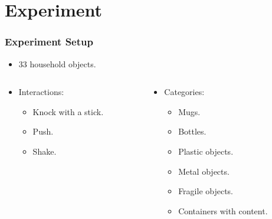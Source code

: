 \documentclass{beamer}
\begin{document}
  \section{Experiment}
  \begin{frame}
    \frametitle{Experiment Setup}

    \begin{itemize}
      \item 33 household objects.
    \end{itemize}

    \begin{columns}
      \begin{column}{.45\textwidth}
        \begin{itemize}
          \item Interactions:
            \begin{itemize}
              \item Knock with a stick.
              \item Push.
              \item Shake.
            \end{itemize}
        \end{itemize}
      \end{column}
      \begin{column}{.45\textwidth}
        \begin{itemize}
          \item Categories:
            \begin{itemize}
              \item Mugs.
              \item Bottles.
              \item Plastic objects.
              \item Metal objects.
              \item Fragile objects.
              \item Containers with content.
            \end{itemize}
        \end{itemize}
      \end{column}
    \end{columns}
  \end{frame}
\end{document}
